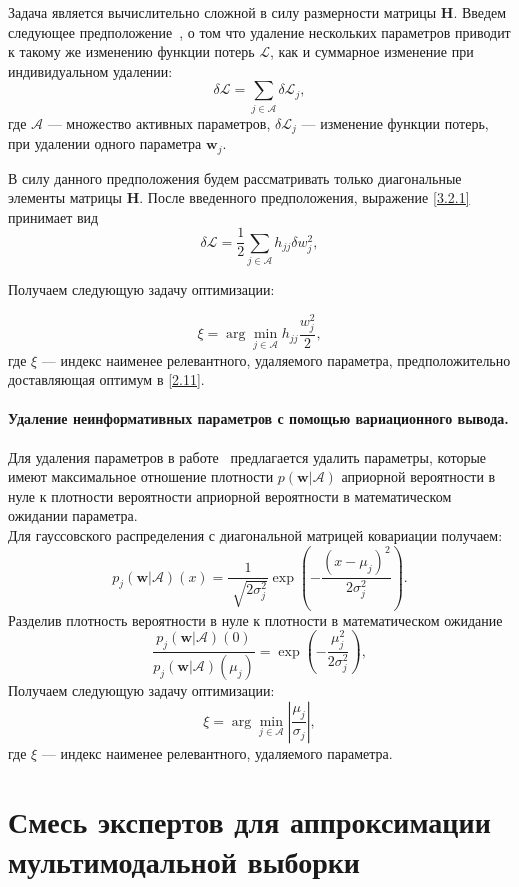 Задача является вычислительно сложной в силу размерности матрицы \textbf{H}. Введем следующее предположение~\cite{cun1990}, о том что удаление нескольких параметров приводит к такому же изменению функции потерь $\mathcal{L}$, как и суммарное изменение при индивидуальном удалении:
\[
\label{3.2.3}
\delta \mathcal{L} = \sum_{j\in \mathcal{A}} \delta \mathcal{L}_j,
\]
где $\mathcal{A}$ --- множество активных параметров, $\delta\mathcal{L}_j$ --- изменение функции потерь, при удалении одного параметра $\textbf{w}_j$.

В силу данного предположения будем рассматривать только диагональные элементы матрицы \textbf{H}. После введенного предположения, выражение \eqref{3.2.1} принимает вид
\[
\label{3.2.4}
\delta \mathcal{L} = \frac{1}{2} \sum_{j\in \mathcal{A}} h_{jj}\delta w_j^2, 
\]

Получаем следующую задачу оптимизации:

\[
\label{3.2.5}
\xi = \arg\min_{j\in \mathcal{A}} h_{jj}\frac{w_j^2}{2},
\]
где $\xi$ --- индекс наименее релевантного, удаляемого параметра, предположительно доставляющая оптимум в \eqref{2.11}.

\paragraph{Удаление неинформативных параметров с помощью вариационного вывода.}
Для удаления параметров в работе~\cite{graves2011} предлагается удалить параметры, которые имеют максимальное отношение плотности $p(\textbf{w}|\mathcal{A})$ априорной вероятности в нуле к плотности вероятности априорной вероятности в математическом ожидании параметра.\\
Для гауссовского распределения с диагональной матрицей ковариации получаем:
\[
\label{3.3.1}
p_j(\textbf{w}|\mathcal{A})(x) = \frac{1}{\sqrt[]{2\sigma_j^2}}\exp({-\frac{(x-\mu_j)^2}{2\sigma_j^2}}).
\]
Разделив плотность вероятности в нуле к плотности в математическом ожидание
\[
\label{3.3.2}
\frac{p_j(\textbf{w}|\mathcal{A})(0)}{p_j(\textbf{w}|\mathcal{A})(\mu_j)}= \exp({-\frac{\mu_j^2}{2\sigma_j^2}}),
\]
Получаем следующую задачу оптимизации:
\[
\label{3.3.3}
\xi = \arg\min_{j\in \mathcal{A}} \left|\frac{\mu_j}{\sigma_j}\right|,
\]
где $\xi$ --- индекс наименее релевантного, удаляемого параметра.

\section{Смесь экспертов для аппроксимации мультимодальной выборки }


